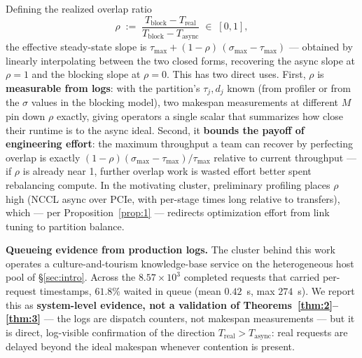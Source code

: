 \documentclass[11pt]{article}
\begin{document}
Defining the realized overlap ratio
\[
\rho \;:=\; \frac{T_{\text{block}}-T_{\text{real}}}{T_{\text{block}}-T_{\text{async}}} \;\in\; [0,1],
\]
the effective steady-state slope is $\tau_{\max}+(1-\rho)\,(\sigma_{\max}-\tau_{\max})$ --- obtained by linearly interpolating between the two closed forms, recovering the async slope at $\rho=1$ and the blocking slope at $\rho=0$. This has two direct uses. First, $\rho$ is \textbf{measurable from logs}: with the partition's $\tau_j,d_j$ known (from profiler or from the $\sigma$ values in the blocking model), two makespan measurements at different $M$ pin down $\rho$ exactly, giving operators a single scalar that summarizes how close their runtime is to the async ideal. Second, it \textbf{bounds the payoff of engineering effort}: the maximum throughput a team can recover by perfecting overlap is exactly $(1-\rho)(\sigma_{\max}-\tau_{\max})/\tau_{\max}$ relative to current throughput --- if $\rho$ is already near 1, further overlap work is wasted effort better spent rebalancing compute. In the motivating cluster, preliminary profiling places $\rho$ high (NCCL async over PCIe, with per-stage times long relative to transfers), which --- per Proposition~\ref{prop:1} --- redirects optimization effort from link tuning to partition balance.

\textbf{Queueing evidence from production logs.} The cluster behind this work operates a culture-and-tourism knowledge-base service on the heterogeneous host pool of \S\ref{sec:intro}. Across the $8.57\times10^3$ completed requests that carried per-request timestamps, $61.8\%$ waited in queue (mean $0.42$~s, max $274$~s). We report this as \textbf{system-level evidence, not a validation of Theorems~\ref{thm:2}--\ref{thm:3}} --- the logs are dispatch counters, not makespan measurements --- but it is direct, log-visible confirmation of the direction $T_{\text{real}}>T_{\text{async}}$: real requests are delayed beyond the ideal makespan whenever contention is present.
\end{document}
